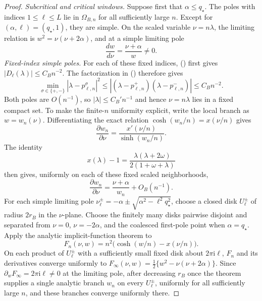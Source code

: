 \documentclass[twoside,10pt]{article}
\numberwithin{equation}{section}
\theoremstyle{slbody}
\theoremstyle{definition}
\theoremstyle{remark}
\renewcommand{\eqref}[1]{%
  \textup{{\normalfont(\oldstylenums{\ref{#1}}}\normalfont)}}
\begin{document}
\begin{proof}
\smallskip
\noindent\emph{Subcritical and critical windows.}
Suppose first that $\alpha\le q_\star$.  The poles with indices
$1\le\ell\le L$ lie in $\Omega_{B,n}$ for all sufficiently large
$n$.  Except for $(\alpha,\ell)=(q_\star,1)$, they are simple.  On the
scaled variable $\nu=n\lambda$, the limiting relation is
$w^2=\nu(\nu+2\alpha)$, and at a simple limiting pole
\[
 \frac{dw}{d\nu}=\frac{\nu+\alpha}{w}\ne0.
\]
\smallskip
\noindent\emph{Fixed-index simple poles.}
For each of these fixed indices,
\eqref{eq:critical-cosh-local-bound} first gives
$|D_\ell(\lambda)|\le C_Bn^{-2}$.  The factorization in
\eqref{eq:critical-w-pole-factorization} therefore gives
\[
 \min_{\sigma\in\{+,-\}}
 |\lambda-p_{\ell,n}^{\sigma}|^2
 \le |(\lambda-p_{\ell,n}^+)(\lambda-p_{\ell,n}^-)|
 \le C_Bn^{-2}.
\]
Both poles are $O(n^{-1})$, so $|\lambda|\le C_B'n^{-1}$ and hence
$\nu=n\lambda$ lies in a fixed compact set.
To make the finite-$n$ uniformity explicit, write the local branch as
$w=w_n(\nu)$.  Differentiating the exact relation
$\cosh(w_n/n)=x(\nu/n)$ gives
\[
 \frac{\partial w_n}{\partial\nu}
 =\frac{x'(\nu/n)}{\sinh(w_n/n)}.
\]
The identity
\[
 x(\lambda)-1
 =\frac{\lambda(\lambda+2\omega)}
        {2(1+\omega+\lambda)}
\]
then gives, uniformly on each of these fixed scaled neighborhoods,
\[
 \frac{\partial w_n}{\partial\nu}
 =\frac{\nu+\alpha}{w_n}+O_B(n^{-1}).
\]
For each simple limiting pole
$\nu_\ell^\pm=-\alpha\pm\sqrt{\alpha^2-\ell^2q_\star^2}$, choose a closed
disk $U_\ell^\pm$ of radius $2r_B$ in the $\nu$-plane.  Choose the finitely
many disks pairwise disjoint and separated from $\nu=0$, $\nu=-2\alpha$,
and the coalesced first-pole point when $\alpha=q_\star$.  Apply the analytic
implicit-function theorem to
\[
 F_n(\nu,w)=n^2\bigl(\cosh(w/n)-x(\nu/n)\bigr).
\]
On each product of $U_\ell^\pm$ with a sufficiently small fixed disk about
$2\pi\mathrm i\ell$, $F_n$ and its derivatives converge uniformly to
$F_\infty(\nu,w)=\tfrac12\{w^2-\nu(\nu+2\alpha)\}$.  Since
$\partial_wF_\infty=2\pi\mathrm i\ell\ne0$ at the limiting pole, after
decreasing $r_B$ once the theorem supplies a single analytic branch $w_n$ on
every $U_\ell^\pm$, uniformly for all sufficiently large $n$, and these
branches converge uniformly there.


\end{proof}
\end{document}
